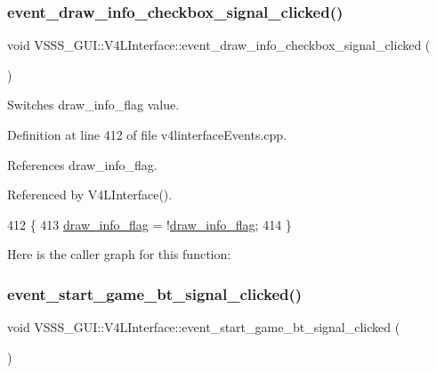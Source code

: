 \subsubsection{\texorpdfstring{event\+\_\+draw\+\_\+info\+\_\+checkbox\+\_\+signal\+\_\+clicked()}{event\_draw\_info\_checkbox\_signal\_clicked()}}
{\footnotesize\ttfamily void V\+S\+S\+S\+\_\+\+G\+U\+I\+::\+V4\+L\+Interface\+::event\+\_\+draw\+\_\+info\+\_\+checkbox\+\_\+signal\+\_\+clicked (\begin{DoxyParamCaption}{ }\end{DoxyParamCaption})}



Switches draw\+\_\+info\+\_\+flag value. 



Definition at line 412 of file v4linterface\+Events.\+cpp.



References draw\+\_\+info\+\_\+flag.



Referenced by V4\+L\+Interface().


\begin{DoxyCode}
412                                                                \{
413         \hyperlink{class_v_s_s_s___g_u_i_1_1_v4_l_interface_acfa3f205af98a194432aca85f3e6efe9}{draw\_info\_flag} = !\hyperlink{class_v_s_s_s___g_u_i_1_1_v4_l_interface_acfa3f205af98a194432aca85f3e6efe9}{draw\_info\_flag};
414     \}
\end{DoxyCode}
Here is the caller graph for this function\+:
\mbox{\label{class_v_s_s_s___g_u_i_1_1_v4_l_interface_a8c3f91048adebeb0b5aa9838053cdcfe}} 
\subsubsection{\texorpdfstring{event\+\_\+start\+\_\+game\+\_\+bt\+\_\+signal\+\_\+clicked()}{event\_start\_game\_bt\_signal\_clicked()}}
{\footnotesize\ttfamily void V\+S\+S\+S\+\_\+\+G\+U\+I\+::\+V4\+L\+Interface\+::event\+\_\+start\+\_\+game\+\_\+bt\+\_\+signal\+\_\+clicked (\begin{DoxyParamCaption}{ }\end{DoxyParamCaption})}



